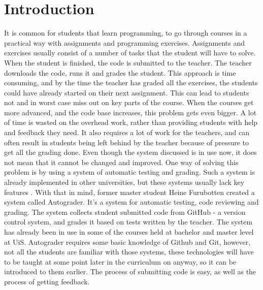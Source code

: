\chapter*{Introduction}

It is common for students that learn programming, to go through courses in a practical way with assignments and programming exercises. Assignments and exercises usually consist of a number of tasks that the student will have to solve. When the student is finished, the code is submitted to the teacher. The teacher downloads the code, runs it and grades the student. This approach is time consuming, and by the time the teacher has graded all the exercises, the students could have already started on their next assignment. This can lead to students not  and in worst case miss out on key parts of the course. When the courses get more advanced, and the code base increases, this problem gets even bigger. A lot of time is wasted on the overhead work, rather than providing students with help and feedback they need. It also requires a lot of work for the teachers, and can often result in students being left behind by the teacher because of pressure to get all the grading done. Even though the system discussed  is in use now, it does not mean that it cannot be changed and improved. One way of solving this problem is by using a system of automatic testing and grading. Such a system is already implemented in other universities, but these systems usually lack key features . With that in mind, former master student Heine Furubotten created a system called Autograder. It's a system for automatic testing, code reviewing and grading. The system collects student submitted code from GitHub - a version control system, and grades it based on tests written by the teacher. The system has already been in use in some of the courses held at bachelor and master level at UiS. Autograder requires some basic knowledge of Github and Git, however, not all the students are familiar with those systems, these technologies will have to be taught at some point later in the curriculum on anyway, so it can be introduced to them earlier. The process of submitting code is easy, as well as the process of getting feedback.

